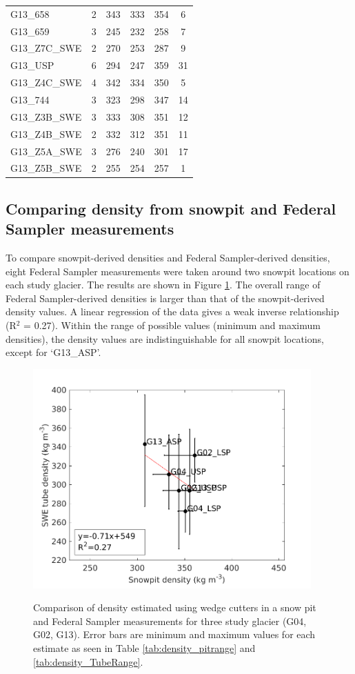 \documentclass[12pt]{article}
\begin{document}
\begin{table}[]
\begin{tabular}{lccccc}
G13\_658 & 2 & 343 & 333 & 354 & 6 \\
G13\_659 & 3 & 245 & 232 & 258 & 7 \\
G13\_Z7C\_SWE & 2 & 270 & 253 & 287 & 9 \\
G13\_USP & 6 & 294 & 247 & 359 & 31 \\
G13\_Z4C\_SWE & 4 & 342 & 334 & 350 & 5 \\
G13\_744 & 3 & 323 & 298 & 347 & 14 \\
G13\_Z3B\_SWE & 3 & 333 & 308 & 351 & 12 \\
G13\_Z4B\_SWE & 2 & 332 & 312 & 351 & 11 \\
G13\_Z5A\_SWE & 3 & 276 & 240 & 301 & 17 \\
G13\_Z5B\_SWE & 2 & 255 & 254 & 257 & 1
\end{tabular}
\end{table}

\subsection*{Comparing density from snowpit and Federal Sampler measurements}

To compare snowpit-derived densities and Federal Sampler-derived densities, eight Federal Sampler measurements were taken around two snowpit locations on each study glacier. The results are shown in Figure \ref{fig:density_pitVStube}. The overall range of Federal Sampler-derived densities is larger than that of the snowpit-derived density values. A linear regression of the data gives a weak inverse relationship (R$^2$ = 0.27). Within the range of possible values (minimum and maximum densities), the density values are indistinguishable for all snowpit locations, except for `G13\_ASP'.

\begin{figure}[H]
	\centering
	\includegraphics[width =0.95\textwidth]{SnowpitVsSWEtube_all.png}\\
	\caption{Comparison of density estimated using wedge cutters in a snow pit and Federal Sampler measurements for three study glacier (G04, G02, G13). Error bars are minimum and maximum values for each estimate as seen in Table \ref{tab:density_pitrange} and \ref{tab:density_TubeRange}.}
	\label{fig:density_pitVStube}
\end{figure}
\end{document}
